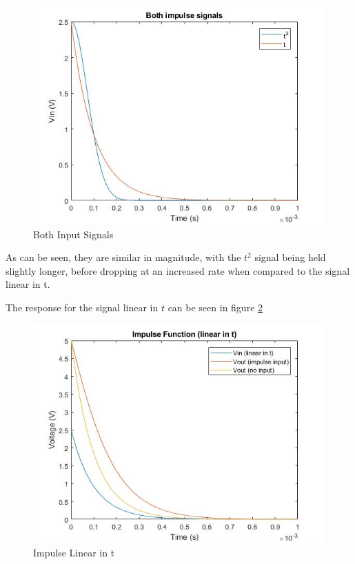 \documentclass[11pt, oneside, titlepage]{article}   	%
\begin{document}
\begin{figure}[H]
\center
\includegraphics[scale = 0.5]{exercise1_5}
\caption{Both Input Signals} \label{fig:ex1_5}
\end{figure}

As can be seen, they are similar in magnitude, with the $t^2$ signal being held slightly longer, before dropping at an increased rate when compared to the signal linear in t. 

The response for the signal linear in $t$ can be seen in figure \ref{fig:ex1_6}

\begin{figure}[H]
\center
\includegraphics[scale = 0.5]{exercise1_6}
\caption{Impulse Linear in t} \label{fig:ex1_6}
\end{figure}
\end{document}
